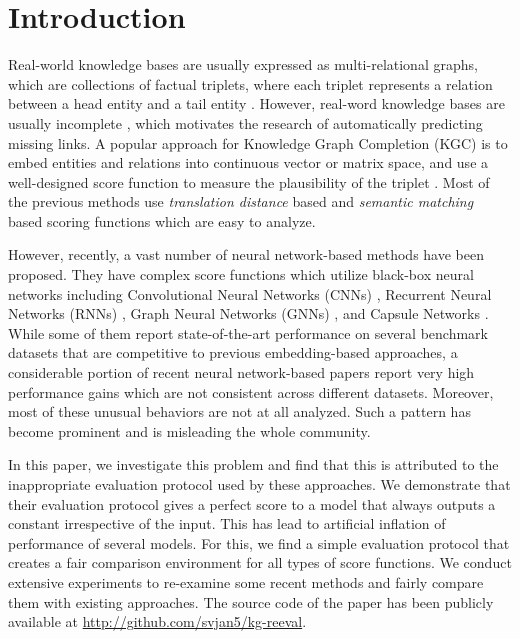 \documentclass[11pt,a4paper]{article}
\begin{document}
\section{Introduction}
\label{sec:intro}

Real-world knowledge bases are usually expressed as multi-relational graphs, which are collections of factual triplets, where each triplet  represents a relation  between a head entity  and a tail entity .
However, real-word knowledge bases are usually incomplete \cite{kg_incomp1}, which motivates the research of automatically predicting missing links.
A popular approach for Knowledge Graph Completion (KGC) is to embed entities and relations into continuous vector or matrix space, and use a well-designed score function  to measure the plausibility of the triplet .
Most of the previous methods use \textit{translation distance} based \cite{transe,transh,transg,rotate} and \textit{semantic matching} based \cite{rescal2013,distmult,hole,complex,analogy} scoring functions which are easy to analyze. 

However, recently, a vast number of neural network-based methods have been proposed. They have complex score functions which utilize black-box neural networks including Convolutional Neural Networks (CNNs) \cite{conve,convkb}, Recurrent Neural Networks (RNNs) \cite{ptranse,dolores}, Graph Neural Networks (GNNs) \cite{r_gcn,sacn_paper}, and Capsule Networks \cite{capse}. While some of them report state-of-the-art performance on several benchmark datasets that are competitive to previous embedding-based approaches, a considerable portion of recent neural network-based papers report very high performance gains which are not consistent across different datasets. Moreover, most of these unusual behaviors are not at all analyzed. Such a pattern has become prominent and is misleading the whole community.



In this paper, we investigate this problem and find that this is attributed to the inappropriate evaluation protocol used by these approaches. 
We demonstrate that their evaluation protocol gives a perfect score to a model that always outputs a constant irrespective of the input. This has lead to artificial inflation of performance of several models. 
For this, we find a simple evaluation protocol that creates a fair comparison environment for all types of score functions. We conduct extensive experiments to re-examine some recent methods and fairly compare them with existing approaches. The source code of the paper has been publicly available at \url{http://github.com/svjan5/kg-reeval}.
\end{document}
